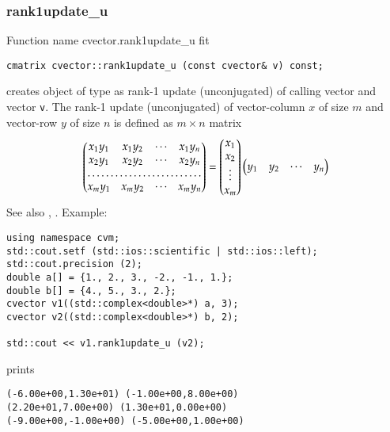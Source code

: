 \subsubsection{rank1update\_u}
Function%
\pdfdest name {cvector.rank1update_u} fit
\begin{verbatim}
cmatrix cvector::rank1update_u (const cvector& v) const;
\end{verbatim}
creates  object of type 
as  rank-1 update (unconjugated) of
 calling vector and  vector \verb"v".
The rank-1 update (unconjugated)
of  vector-column $x$ of  size $m$ and
 vector-row $y$ of  size $n$ is defined as $m\times n$ matrix
\begin{equation*}
\begin{pmatrix}
x_1 y_1 & x_1 y_2 & \cdots & x_1 y_n \\
x_2 y_1 & x_2 y_2 & \cdots & x_2 y_n \\
\hdotsfor{4} \\
x_m y_1 & x_m y_2 & \cdots & x_m y_n
\end{pmatrix} =
\begin{pmatrix}
x_1 \\
x_2 \\
\vdots \\
x_m
\end{pmatrix}
\begin{pmatrix}
y_1 & y_2 & \cdots & y_n
\end{pmatrix}
\end{equation*}
See also , .
Example:
\begin{Verbatim}
using namespace cvm;
std::cout.setf (std::ios::scientific | std::ios::left);
std::cout.precision (2);
double a[] = {1., 2., 3., -2., -1., 1.};
double b[] = {4., 5., 3., 2.};
cvector v1((std::complex<double>*) a, 3);
cvector v2((std::complex<double>*) b, 2);

std::cout << v1.rank1update_u (v2);
\end{Verbatim}
prints
\begin{Verbatim}
(-6.00e+00,1.30e+01) (-1.00e+00,8.00e+00)
(2.20e+01,7.00e+00) (1.30e+01,0.00e+00)
(-9.00e+00,-1.00e+00) (-5.00e+00,1.00e+00)
\end{Verbatim}
\newpage



